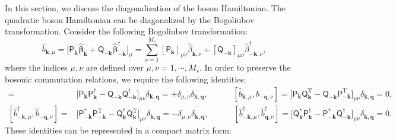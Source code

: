 In this section, we discuss the diagonalization of the boson Hamiltonian. 
The quadratic boson Hamiltonian can be diagonalized by the Bogoliubov transformation. 
Consider the following Bogoliubov transformation:
\begin{equation}
    \hat{b}_{\mathbf{k}, \mu} 
    = \big[ \mathsf{P}_{\mathbf{k}}^{\phantom \dagger} \hat{\bm \beta}_{\mathbf{k}}^{\phantom \dagger} + \mathsf{Q}_{-\mathbf{k}}^{\phantom \dagger} \hat{\bm \beta}_{-\mathbf{k}}^{\dagger} \big]_{\mu}
    = \sum_{\nu = 1}^{M_s} [\mathsf{P}_{\mathbf{k}}]_{\mu\nu}^{\phantom \dagger} \hat{\beta}_{\mathbf{k}, \nu}^{\phantom \dagger} + [\mathsf{Q}_{-\mathbf{k}}]_{\mu\nu}^{\phantom \dagger} \hat{\beta}_{-\mathbf{k}, \nu}^{\dagger},
\end{equation}
where the indices $\mu, \nu$ are defined over $\mu, \nu = 1, \cdots, M_s$.
In order to preserve the bosonic commutation relations, we require the following identities:
\begin{align*}
    [\hat{b}_{  \mathbf{k}, \mu}^{\phantom \dagger}, \hat{b}_{  \mathbf{q}, \nu}^{\dagger}] 
    = & \big[ \mathsf{P}_{\mathbf{k}}\mathsf{P}_{\mathbf{k}}^{\dagger} - \mathsf{Q}_{-\mathbf{k}}\mathsf{Q}_{-\mathbf{k}}^{\dagger} \big]_{\mu\nu} \delta_{\mathbf{k},\mathbf{q}}
    = + \delta_{\mu,\nu}    \delta_{\mathbf{k}, \mathbf{q}} ,
    \qquad \quad
    [\hat{b}_{  \mathbf{k}, \mu}, \hat{b}_{-\mathbf{q}, \nu}] 
    = \big[ \mathsf{P}_{\mathbf{k}}\mathsf{Q}_{\mathbf{k}}^{\mathrm{T}} - \mathsf{Q}_{-\mathbf{k}}\mathsf{P}_{-\mathbf{k}}^{\mathrm{T}} \big]_{\mu\nu} \delta_{\mathbf{k},\mathbf{q}} = 0, \\
    [\hat{b}_{-\mathbf{k}, \mu}^{\dagger}, \hat{b}_{-\mathbf{q}, \nu}^{\phantom \dagger}] 
    = & \big[ \mathsf{P}_{-\mathbf{k}}^{*}\mathsf{P}_{-\mathbf{k}}^{\mathrm{T}} - \mathsf{Q}_{\mathbf{k}}^{*}\mathsf{Q}_{\mathbf{k}}^{\mathrm{T}} \big]_{\mu\nu} \delta_{\mathbf{k},\mathbf{q}}
    = - \delta_{\mu,\nu}    \delta_{\mathbf{k}, \mathbf{q}}, 
    \qquad \quad
    [\hat{b}_{-\mathbf{k}, \mu}^{\dagger}, \hat{b}_{  \mathbf{q}, \nu}^{\dagger}] 
    = \big[ \mathsf{Q}_{\mathbf{k}}^{*}\mathsf{P}_{\mathbf{k}}^{\dagger} - \mathsf{P}_{-\mathbf{k}}^{*}\mathsf{Q}_{-\mathbf{k}}^{\dagger} \big]_{\mu\nu} \delta_{\mathbf{k},\mathbf{q}}
    = 0.
\end{align*}
These identities can be represented in a compact matrix form:
